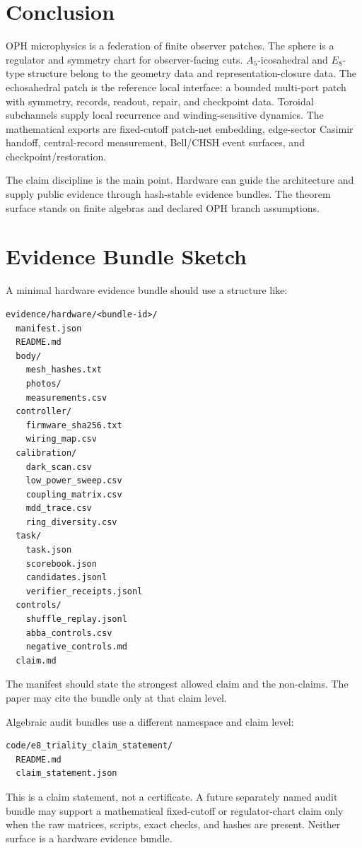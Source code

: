 \documentclass[11pt]{article}
\theoremstyle{remark}
\theoremstyle{plain}
\begin{document}


\section{Conclusion}

OPH microphysics is a federation of finite observer patches. The sphere is a regulator and
symmetry chart for observer-facing cuts. \(A_5\)-icosahedral and \(E_8\)-type structure belong to
the geometry data and representation-closure data. The echosahedral patch is the reference local
interface: a bounded multi-port patch with symmetry, records, readout, repair, and checkpoint
data. Toroidal subchannels supply local recurrence and winding-sensitive dynamics. The mathematical
exports are fixed-cutoff patch-net embedding, edge-sector Casimir handoff, central-record
measurement, Bell/CHSH event surfaces, and checkpoint/restoration.

The claim discipline is the main point. Hardware can guide the architecture and supply public
evidence through hash-stable evidence bundles. The theorem surface stands on finite algebras and
declared OPH branch assumptions.

\appendix

\section{Evidence Bundle Sketch}

A minimal hardware evidence bundle should use a structure like:
\begin{verbatim}
evidence/hardware/<bundle-id>/
  manifest.json
  README.md
  body/
    mesh_hashes.txt
    photos/
    measurements.csv
  controller/
    firmware_sha256.txt
    wiring_map.csv
  calibration/
    dark_scan.csv
    low_power_sweep.csv
    coupling_matrix.csv
    mdd_trace.csv
    ring_diversity.csv
  task/
    task.json
    scorebook.json
    candidates.jsonl
    verifier_receipts.jsonl
  controls/
    shuffle_replay.jsonl
    abba_controls.csv
    negative_controls.md
  claim.md
\end{verbatim}

The manifest should state the strongest allowed claim and the non-claims. The paper may cite the
bundle only at that claim level.

Algebraic audit bundles use a different namespace and claim level:
\begin{verbatim}
code/e8_triality_claim_statement/
  README.md
  claim_statement.json
\end{verbatim}
This is a claim statement, not a certificate. A future separately named audit bundle may support a
mathematical fixed-cutoff or regulator-chart claim only when the raw matrices, scripts, exact checks,
and hashes are present. Neither surface is a hardware evidence bundle.
\end{document}
